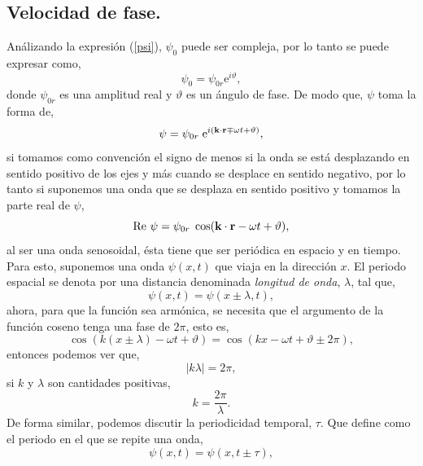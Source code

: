 \documentclass[11pt,fleqn]{book} %
\begin{document}
\subsection{Velocidad de fase.}
An\'alizando la expresi\'on (\ref{psi}), $\psi_0$ puede ser compleja, por lo tanto se puede expresar como,
\begin{equation*}
 \psi_0=\psi_{0r} \text{e}^{i\vartheta},
\end{equation*}
donde $\psi_{0r}$ es una amplitud real y $\vartheta$ es un \'angulo de fase. De modo que, $\psi$ toma la forma de,
\begin{equation*} \label{psi}
\psi=\psi_{0r} \hspace{1mm}\text{e} ^{i(\textbf{k}\cdot\textbf{r} \mp \omega t+\vartheta)},
\end{equation*}
si tomamos como convenci\'on el signo de menos si la onda se est\'a desplazando en sentido positivo de los ejes y
m\'as cuando se desplace en sentido negativo, por lo tanto si suponemos una onda que se desplaza en sentido positivo y tomamos la
parte real de $\psi$,
\begin{equation*} \label{psi}
\text{Re }\psi=\psi_{0r} \hspace{1mm}\cos(\textbf{k}\cdot\textbf{r} - \omega t+\vartheta),
\end{equation*}
al ser una onda senosoidal, \'esta tiene que ser peri\'odica en espacio y en tiempo. Para esto, suponemos una onda $\psi(x,t)$ que viaja en la direcci\'on $x$.
El periodo espacial se denota por una distancia denominada \textit{longitud de onda}, $\lambda $, tal que,
\begin{equation*}
 \psi(x,t)=\psi(x \pm \lambda ,t),
\end{equation*}
ahora, para que la funci\'on sea arm\'onica, se necesita que el argumento de la funci\'on coseno tenga una fase de $2\pi$, esto es,
\begin{equation*}
 \cos(k(x \pm \lambda) - \omega t+\vartheta)=\cos(kx - \omega t+\vartheta\pm 2\pi),
\end{equation*}
entonces podemos ver que,
\begin{equation*}
|k\lambda|=2\pi,
\end{equation*}
si $k$ y $\lambda$ son cantidades positivas,
\begin{equation}
k=\frac{2\pi}{\lambda}.
\end{equation}
De forma similar, podemos discutir la periodicidad temporal, $\tau$. Que define como el periodo en el que se repite una onda,
\begin{equation*}
 \psi(x,t)=\psi(x ,t\pm \tau ),
\end{equation*}
\end{document}

